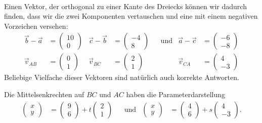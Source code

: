 \begin{loesung}
\begin{teilaufgaben}
\[\begin{aligned}
\end{aligned}
\]
%
%
\item Einen Vektor, der orthogonal zu einer Kante des Dreiecks können
wir dadurch finden, dass wir die zwei Komponenten vertauschen und eine
mit einem negativen Vorzeichen versehen:
\[
\begin{aligned}
\vec{b}-\vec{a}&=\begin{pmatrix}10\\ 0\end{pmatrix}&
\vec{c}-\vec{b}&=\begin{pmatrix}-4\\ 8\end{pmatrix}&
&\text{und}&
\vec{a}-\vec{c}&=\begin{pmatrix}-6\\-8\end{pmatrix}
\\
   \vec{v}_{AB}&=\begin{pmatrix} 0\\ 1\end{pmatrix}&
   \vec{v}_{BC}&=\begin{pmatrix} 2\\ 1\end{pmatrix}&
&&
   \vec{v}_{CA}&=\begin{pmatrix} 4\\-3\end{pmatrix}
\end{aligned}
\]
Beliebige Vielfache dieser Vektoren sind natürlich auch korrekte 
Antworten.
%
%
\item
Die Mittelsenkrechten auf $BC$ und $AC$ haben die Parameterdarstellung
\[
\begin{aligned}
\begin{pmatrix}x\\y\end{pmatrix}
&=
\begin{pmatrix}9\\6\end{pmatrix}+t\begin{pmatrix}2\\ 1\end{pmatrix}
&&\text{und}&
\begin{pmatrix}x\\y\end{pmatrix}
&=
\begin{pmatrix}4\\6\end{pmatrix}+s\begin{pmatrix}4\\-3\end{pmatrix}.

\end{aligned}\]
\end{teilaufgaben}
\end{loesung}
